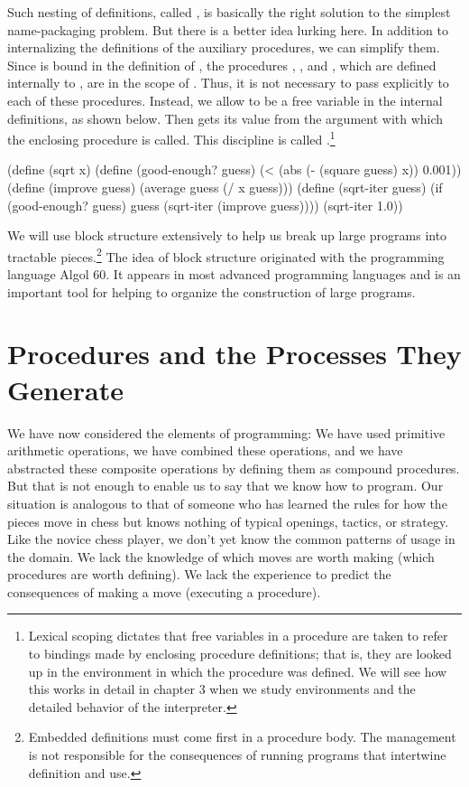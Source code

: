\noindent
Such nesting of definitions, called , is basically the
right solution to the simplest name-packaging problem.  But there is a better
idea lurking here.  In addition to internalizing the definitions of the
auxiliary procedures, we can simplify them.  Since  is bound in the
definition of , the procedures , ,
and , which are defined internally to , are in the
scope of .  Thus, it is not necessary to pass  explicitly to
each of these procedures.  Instead, we allow  to be a free variable in
the internal definitions, as shown below. Then  gets its value from the
argument with which the enclosing procedure  is called.  This
discipline is called .\footnote{Lexical scoping dictates
that free variables in a procedure are taken to refer to bindings made by enclosing
procedure definitions; that is, they are looked up in the environment in which the
procedure was defined. We will see how this works in detail in chapter 3 when we study
environments and the detailed behavior of the interpreter.\label{Footnote 28}}

\begin{codeBlock}
(define (sqrt x)
  (define (good-enough? guess)
    (< (abs (- (square guess) x)) 0.001))
  (define (improve guess)
    (average guess (/ x guess)))
  (define (sqrt-iter guess)
    (if (good-enough? guess)
        guess
        (sqrt-iter (improve guess))))
  (sqrt-iter 1.0))
\end{codeBlock}

\noindent
We will use block structure extensively to help us break up large
programs into tractable pieces.\footnote{Embedded definitions must come
first in a procedure body. The management is not responsible for the
consequences of running programs that intertwine definition and use.}
The idea of block structure originated with the programming language
Algol 60. It appears in most advanced programming languages and is an
important tool for helping to organize the construction of large
programs.

\section{Procedures and the Processes They \mbox{Generate}}
\label{Section 1.2}

We have now considered the elements of programming: We have used primitive
arithmetic operations, we have combined these operations, and we have
abstracted these composite operations by defining them as compound procedures.
But that is not enough to enable us to say that we know how to program.  Our
situation is analogous to that of someone who has learned the rules for how the
pieces move in chess but knows nothing of typical openings, tactics, or
strategy.  Like the novice chess player, we don't yet know the common patterns
of usage in the domain.  We lack the knowledge of which moves are worth making
(which procedures are worth defining).  We lack the experience to predict the
consequences of making a move (executing a procedure).

